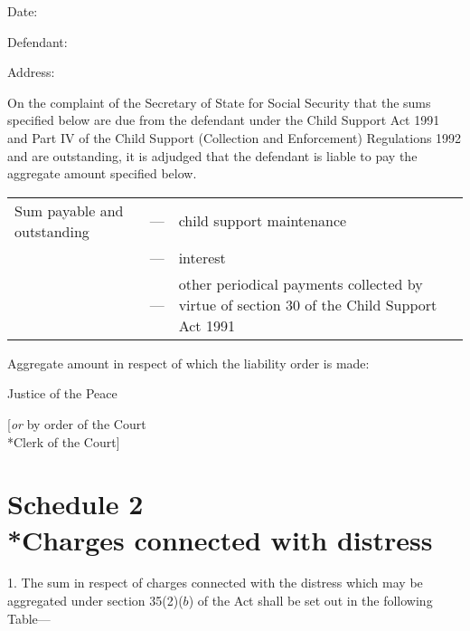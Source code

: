 \documentclass[12pt,a4paper]{article}
\begin{document}
\medskip

Date:

\medskip

Defendant:

\medskip

Address:

\medskip

On the complaint of the Secretary of State for Social Security that the sums specified below are due from the defendant under the Child Support Act 1991 and Part IV of the Child Support (Collection and Enforcement) Regulations 1992 and are outstanding, it is adjudged that the defendant is liable to pay the aggregate amount specified below.

\medskip

\noindent
\begin{tabulary}{0.9\linewidth}{lJJ}
Sum payable and outstanding \hspace{0.075\linewidth} &  --- & child support maintenance\\
&--- & interest\\
& --- & other periodical payments collected by virtue of section 30 of the Child Support Act 1991\\
\end{tabulary}

\medskip

Aggregate amount in respect of which the liability order is made:

\medskip

{\raggedleft Justice of the Peace

\medskip

[\emph{or} by order of the Court\\*Clerk of the Court]

}


\part[Schedule 2 --- Charges connected with distress]{Schedule 2\\*Charges connected with distress}

\renewcommand\parthead{--- Schedule 2}

1.  The sum in respect of charges connected with the distress which may be aggregated under section 35(2)($b$) of the Act shall be set out in the following Table—
\end{document}
